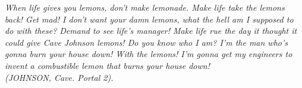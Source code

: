 
\renewcommand{\epigraphname}{EPÍGRAFE}

\begin{epigrafe}

\textit{When life gives you lemons, don't make lemonade. Make life take the lemons back! Get mad! I don't want your damn lemons, what the hell am I supposed to do with these? Demand to see life's manager! Make life rue the day it thought it could give Cave Johnson lemons! Do you know who I am? I'm the man who's gonna burn your house down! With the lemons! I'm gonna get my engineers to invent a combustible lemon that burns your house down! \\(JOHNSON, Cave. Portal 2).}

\end{epigrafe}


